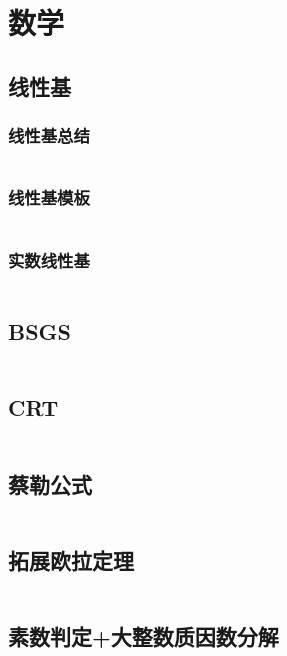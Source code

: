 \documentclass{article}
\begin{document}
\newpage
\section{数学}
\subsection{线性基}
\subsubsection{线性基总结}
\inputminted[breaklines]{text}{../数学/线性基总结.txt}

\subsubsection{线性基模板}
\inputminted[breaklines]{c++}{../数学/线性基模板.cpp}

\subsubsection{实数线性基}
\inputminted[breaklines]{c++}{../数学/实数线性基.cpp}

\subsection{BSGS}
\inputminted[breaklines]{c++}{../数学/BSGS.cpp}

\subsection{CRT}
\inputminted[breaklines]{c++}{../数学/CRT.cpp}

\subsection{蔡勒公式}
\inputminted[breaklines]{c++}{../数学/蔡勒公式.cpp}

\subsection{拓展欧拉定理}
\inputminted[breaklines]{c++}{../数学/拓展欧拉定理.cpp}

\subsection{素数判定+大整数质因数分解}
\inputminted[breaklines]{c++}{../数学/素数判定+大整数质因数分解.cpp}
\end{document}
